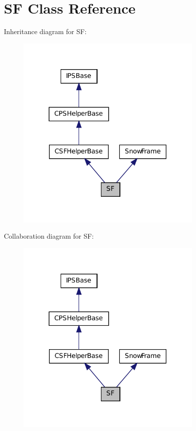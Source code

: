 \hypertarget{classSF}{
\section{SF Class Reference}
\label{classSF}
}


Inheritance diagram for SF:\nopagebreak
\begin{figure}[H]
\begin{center}
\leavevmode
\includegraphics[width=261pt]{classSF__inherit__graph}
\end{center}
\end{figure}


Collaboration diagram for SF:\nopagebreak
\begin{figure}[H]
\begin{center}
\leavevmode
\includegraphics[width=261pt]{classSF__coll__graph}
\end{center}
\end{figure}

